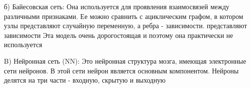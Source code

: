 б) Байесовская сеть: Она используется для проявления взаимосвязей между
различными признаками. Ее можно сравнить с ациклическим графом, в котором узлы
представляют случайную переменную, а ребра - зависимости. представляют
зависимости Эта модель очень дорогостоящая и поэтому она практически не
используется \cite{article18}


B) Нейронная сеть (NN): Это нейронная структура мозга, имеющая электронные сети
нейронов. В этой сети нейрон является основным компонентом. Нейроны делятся на
три части - входную, скрытую и выходную \cite{article18}
